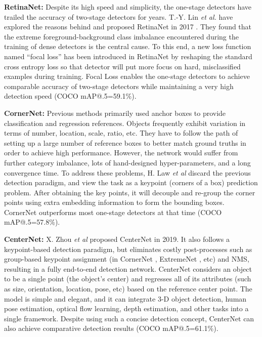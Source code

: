 \documentclass[lettersize,journal]{IEEEtran}
\begin{document}
\textbf{RetinaNet:}
Despite its high speed and simplicity, the one-stage detectors have trailed the accuracy of two-stage detectors for years. T.-Y. Lin \emph{et al.} have explored the reasons behind and proposed RetinaNet in 2017 \cite{ICCV17-Focal}. They found that the extreme foreground-background class imbalance encountered during the training of dense detectors is the central cause. To this end, a new loss function named ``focal loss'' has been introduced in RetinaNet by reshaping the standard cross entropy loss so that detector will put more focus on hard, misclassified examples during training. Focal Loss enables the one-stage detectors to achieve comparable accuracy of two-stage detectors while maintaining a very high detection speed (COCO mAP@.5=59.1\%).

\textbf{CornerNet:}
Previous methods primarily used anchor boxes to provide classification and regression references. Objects frequently exhibit variation in terms of number, location, scale, ratio, etc. They have to follow the path of setting up a large number of reference boxes to better match ground truths in order to achieve high performance. However, the network would suffer from further category imbalance, lots of hand-designed hyper-parameters, and a long convergence time. To address these problems, H. Law \emph{et al} \cite{law2018cornernet} discard the previous detection paradigm, and view the task as a keypoint (corners of a box) prediction problem. After obtaining the key points, it will decouple and re-group the corner points using extra embedding information to form the bounding boxes. CornerNet outperforms most one-stage detectors at that time (COCO mAP@.5=57.8\%).


\textbf{CenterNet:}
X. Zhou \emph{et al} proposed CenterNet \cite{zhou2019objects} in 2019. It also follows a keypoint-based detection paradigm, but eliminates costly post-processes such as group-based keypoint assignment (in CornerNet \cite{law2018cornernet}, ExtremeNet \cite{zhou2019bottom}, etc) and NMS, resulting in a fully end-to-end detection network. CenterNet considers an object to be a single point (the object's center) and regresses all of its attributes (such as size, orientation, location, pose, etc) based on the reference center point. The model is simple and elegant, and it can integrate 3-D object detection, human pose estimation, optical flow learning, depth estimation, and other tasks into a single framework. Despite using such a concise detection concept, CenterNet can also achieve comparative detection results (COCO mAP@.5=61.1\%).
\end{document}
